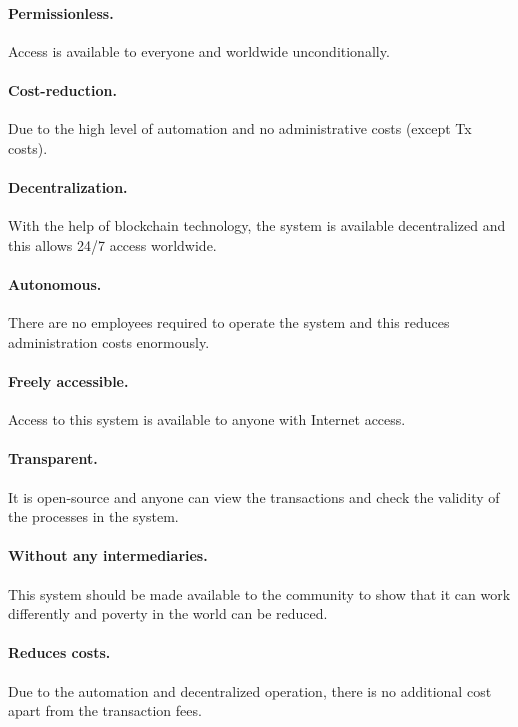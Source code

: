 \paragraph{Permissionless.} 
Access is available to everyone and worldwide unconditionally.

\paragraph{Cost-reduction.} 
Due to the high level of automation and no administrative costs (except Tx costs).

\paragraph{Decentralization.} With the help of blockchain technology, the system is available decentralized and this allows 24/7 access worldwide.

\paragraph{Autonomous.} There are no employees required to operate the system and this reduces administration costs enormously.

\paragraph{Freely accessible.} Access to this system is available to anyone with Internet access.

\paragraph{Transparent.} It is open-source and anyone can view the transactions and check the validity of the processes in the system.

\paragraph{Without any intermediaries.} This system should be made available to the community to show that it can work differently and poverty in the world can be reduced.

\paragraph{Reduces costs.} Due to the automation and decentralized operation, there is no additional cost apart from the transaction fees.


